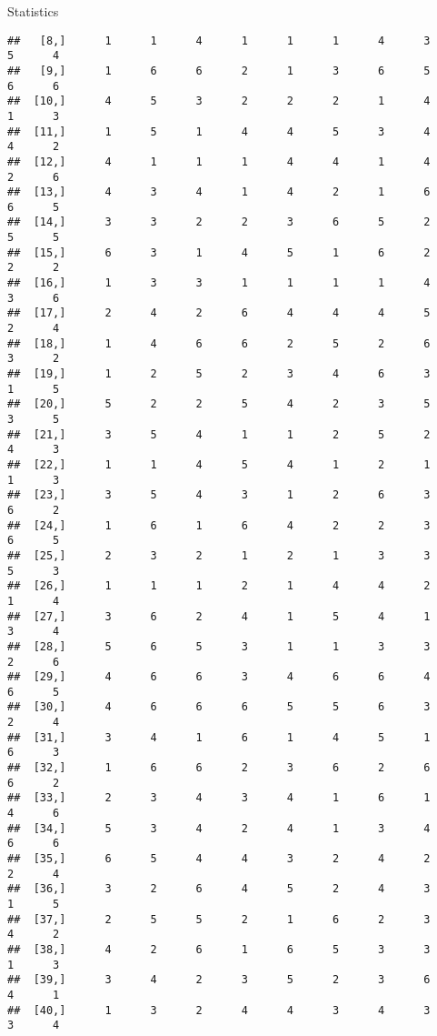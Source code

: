 \documentclass[
  ignorenonframetext,
]{beamer}
\begin{document}
\begin{frame}[fragile]{Statistics}
\begin{verbatim}
##   [8,]      1      1      4      1      1      1      4      3      5      4
##   [9,]      1      6      6      2      1      3      6      5      6      6
##  [10,]      4      5      3      2      2      2      1      4      1      3
##  [11,]      1      5      1      4      4      5      3      4      4      2
##  [12,]      4      1      1      1      4      4      1      4      2      6
##  [13,]      4      3      4      1      4      2      1      6      6      5
##  [14,]      3      3      2      2      3      6      5      2      5      5
##  [15,]      6      3      1      4      5      1      6      2      2      2
##  [16,]      1      3      3      1      1      1      1      4      3      6
##  [17,]      2      4      2      6      4      4      4      5      2      4
##  [18,]      1      4      6      6      2      5      2      6      3      2
##  [19,]      1      2      5      2      3      4      6      3      1      5
##  [20,]      5      2      2      5      4      2      3      5      3      5
##  [21,]      3      5      4      1      1      2      5      2      4      3
##  [22,]      1      1      4      5      4      1      2      1      1      3
##  [23,]      3      5      4      3      1      2      6      3      6      2
##  [24,]      1      6      1      6      4      2      2      3      6      5
##  [25,]      2      3      2      1      2      1      3      3      5      3
##  [26,]      1      1      1      2      1      4      4      2      1      4
##  [27,]      3      6      2      4      1      5      4      1      3      4
##  [28,]      5      6      5      3      1      1      3      3      2      6
##  [29,]      4      6      6      3      4      6      6      4      6      5
##  [30,]      4      6      6      6      5      5      6      3      2      4
##  [31,]      3      4      1      6      1      4      5      1      6      3
##  [32,]      1      6      6      2      3      6      2      6      6      2
##  [33,]      2      3      4      3      4      1      6      1      4      6
##  [34,]      5      3      4      2      4      1      3      4      6      6
##  [35,]      6      5      4      4      3      2      4      2      2      4
##  [36,]      3      2      6      4      5      2      4      3      1      5
##  [37,]      2      5      5      2      1      6      2      3      4      2
##  [38,]      4      2      6      1      6      5      3      3      1      3
##  [39,]      3      4      2      3      5      2      3      6      4      1
##  [40,]      1      3      2      4      4      3      4      3      3      4

\end{verbatim}
\end{frame}
\end{document}
